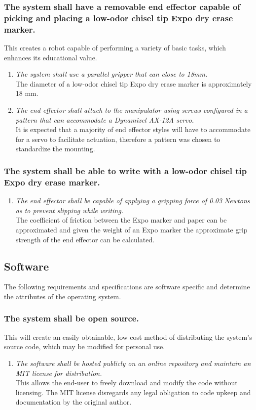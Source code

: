 \documentclass[12pt]{report}
\begin{document}
\subsubsection{The system shall have a removable end effector capable of picking and placing a low-odor chisel tip Expo dry erase marker.}
This creates a robot capable of performing a variety of basic tasks, which enhances its educational value.
\begin{enumerate}[label=\thesubsubsection.\alph*,leftmargin=3cm,font=\itshape]
  \item \textit{The system shall use a parallel gripper that can close to 18mm.} \\
  The diameter of a low-odor chisel tip Expo dry erase marker is approximately 18 mm.
  \item \textit{The end effector shall attach to the manipulator using screws configured in a pattern that can accommodate a Dynamixel AX-12A servo.} \\
  It is expected that a majority of end effector styles will have to accommodate for a servo to facilitate actuation, therefore a pattern was chosen to standardize the mounting.
\end{enumerate}

\subsubsection{The system shall be able to write with a low-odor chisel tip Expo dry erase marker.}
\begin{enumerate}[label=\thesubsubsection.\alph*,leftmargin=3cm,font=\itshape]
  \item \textit{The end effector shall be capable of applying a gripping force of 0.03 Newtons as to prevent slipping while writing.} \\
  The coefficient of friction between the Expo marker and paper can be approximated and given the weight of an Expo marker the approximate grip strength of the end effector can be calculated.
\end{enumerate}
\subsection{Software}
The following requirements and specifications are software specific and determine the attributes of the operating system.
\subsubsection{The system shall be open source.}
This will create an easily obtainable, low cost method of distributing the system’s source code, which may be modified for personal use.
\begin{enumerate}[label=\thesubsubsection.\alph*,leftmargin=3cm,font=\itshape]
  \item \textit{The software shall be hosted publicly on an online repository and maintain an MIT license for distribution.} \\
  This allows the end-user to freely download and modify the code without licensing. The MIT license disregards any legal obligation to code upkeep and documentation by the original author.
\end{enumerate}
\end{document}
